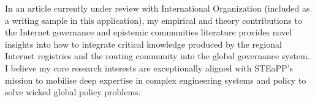 \documentclass[11pt]{letter}
\begin{document}
\begin{letter}
%
%
%
%
In an article currently under review with International Organization (included as a writing sample in this application), my empirical and theory contributions to the Internet governance and epistemic communities literature provides novel insights into how to integrate critical knowledge produced by  the regional Internet registries and the routing community into the global governance system. 
%
%
%
I believe my core research interests are exceptionally aligned with STEaPP's mission to mobilise deep expertise in complex engineering systems and policy to solve wicked global policy problems.


\end{letter}
\end{document}
